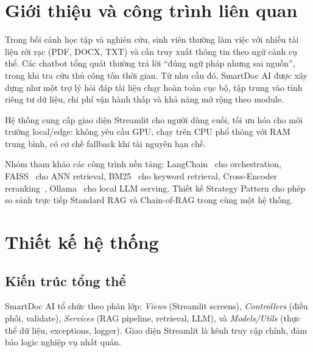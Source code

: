 \documentclass[10pt, conference, a4paper, compsocconf]{IEEEtran}
\begin{document}
\section{Giới thiệu và công trình liên quan}

Trong bối cảnh học tập và nghiên cứu, sinh viên thường làm việc với nhiều tài liệu rời rạc (PDF, DOCX, TXT) và cần truy xuất thông tin theo ngữ cảnh cụ thể. Các chatbot tổng quát thường trả lời ``đúng ngữ pháp nhưng sai nguồn'', trong khi tra cứu thủ công tốn thời gian. Từ nhu cầu đó, SmartDoc AI được xây dựng như một trợ lý hỏi đáp tài liệu chạy hoàn toàn cục bộ, tập trung vào tính riêng tư dữ liệu, chi phí vận hành thấp và khả năng mở rộng theo module.

Hệ thống cung cấp giao diện Streamlit cho người dùng cuối, tối ưu hóa cho môi trường local/edge: không yêu cầu GPU, chạy trên CPU phổ thông với RAM trung bình, có cơ chế fallback khi tài nguyên hạn chế.

Nhóm tham khảo các công trình nền tảng: LangChain~\cite{langchain} cho orchestration, FAISS~\cite{faiss} cho ANN retrieval, BM25~\cite{bm25} cho keyword retrieval, Cross-Encoder reranking~\cite{crossencoder}, Ollama~\cite{ollama} cho local LLM serving. Thiết kế Strategy Pattern cho phép so sánh trực tiếp Standard RAG và Chain-of-RAG trong cùng một hệ thống.

\section{Thiết kế hệ thống}

\subsection{Kiến trúc tổng thể}

SmartDoc AI tổ chức theo phân lớp: \textit{Views} (Streamlit screens), \textit{Controllers} (điều phối, validate), \textit{Services} (RAG pipeline, retrieval, LLM), và \textit{Models/Utils} (thực thể dữ liệu, exceptions, logger). Giao diện Streamlit là kênh truy cập chính, đảm bảo logic nghiệp vụ nhất quán.
\end{document}
